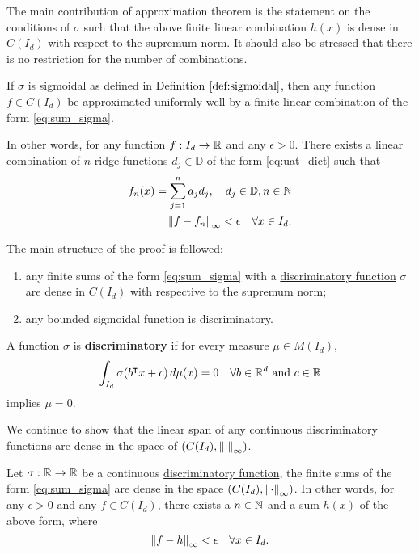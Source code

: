 The main contribution of approximation theorem is the statement on the
conditions of $\sigma$ such that the above finite linear combination $h(x)$ is
dense in $C(I_d)$ with respect to the supremum norm. It should also be stressed
that there is no restriction for the number of combinations.

\begin{theorem}
    \label{thm:uat}
    If $\sigma$ is sigmoidal as defined in Definition $\ref{def:sigmoidal}$,
    then any function $f \in C(I_d)$ be approximated uniformly well by a finite
    linear combination of the form \eqref{eq:sum_sigma}.

    In other words, for any function $f: I_d \to \mathbb{R}$ and any $\epsilon > 0$.
    There exists a linear combination of $n$ ridge functions $d_j \in
    \mathbb{D}$ of the form \eqref{eq:uat_dict} such that
    \begin{align}
        f_n(x) = \sum_{j=1}^n a_j d_j, \quad d_j \in \mathbb{D}, n\in\mathbb{N} \\
        \left\| f - f_n \right\|_{\infty} < \epsilon \quad \forall x \in I_d.
    \end{align}
\end{theorem}


The main structure of the proof is followed:
\begin{enumerate}
    \item any finite sums of the form \eqref{eq:sum_sigma} with a
    \hyperref[def:dis_func]{discriminatory function} $\sigma$ are dense in
    $C(I_d)$ with respective to the supremum norm;
    \item any bounded sigmoidal function is discriminatory.
\end{enumerate}

\begin{definition}
    \label{def:dis_func}
    A function $\sigma$ is \textbf{discriminatory} if for every measure $\mu \in
    M(I_d)$,
    \begin{equation}
        \int_{I_d} \sigma(b{}^{\intercal} x + c) \,d\mu(x) = 0 \quad 
        \forall b \in \mathbb{R}^d \textnormal{ and } c \in \mathbb{R}
    \end{equation}
    implies $\mu = 0$.
\end{definition}

We continue to show that the linear span of any continuous discriminatory
functions are dense in the space of $(C(I_d), \left\| \cdot \right\|_{\infty})$.

\begin{theorem}
    Let $\sigma: \mathbb{R} \to \mathbb{R}$ be a continuous
    \hyperref[def:dis_func]{discriminatory function}, the finite sums of the
    form \eqref{eq:sum_sigma} are dense in the space $(C(I_d),
    \left\| \cdot \right\|_{\infty})$. In other words, for any $\epsilon > 0$ and any $f
    \in C(I_d)$, there exists a $n \in \mathbb{N}$ and a sum $h(x)$ of the above form,
    where
    \begin{equation}
        \left\| f - h \right\|_{\infty} < \epsilon \quad \forall x \in I_d.
    \end{equation}
\end{theorem}

